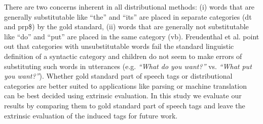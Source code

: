 There are two concerns inherent in all distributional methods: (i)
words that are generally substitutable like ``the'' and ``its'' are
placed in separate categories ({\sc dt} and {\sc prp\$}) by the gold
standard, (ii) words that are generally not substitutable like ``do''
and ``put'' are placed in the same category ({\sc vb}).  Freudenthal
et al.  point out that categories
with unsubstitutable words fail the standard linguistic definition of
a syntactic category and children do not seem to make errors of
substituting such words in utterances (e.g. {\em``What do you want?''}
vs. {\em *``What put you want?''}).  Whether gold standard part of
speech tags or distributional categories are better suited to
applications like parsing or machine translation can be best decided
using extrinsic evaluation.  In this study we evaluate our results by
comparing them to gold standard part of speech tags and leave the
extrinsic evaluation of the induced tags for future work.
